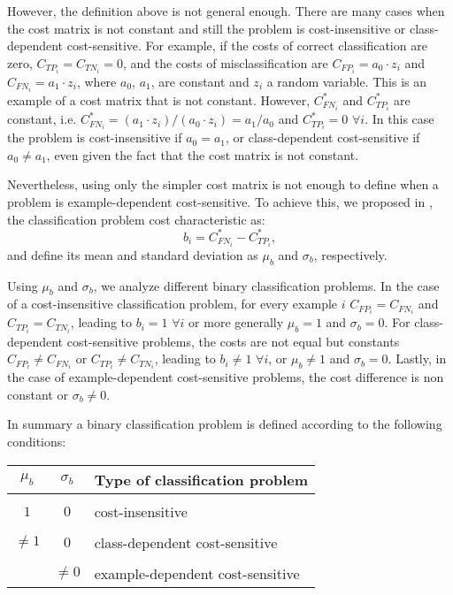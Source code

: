 {{  However, the definition above is not general enough. There are many cases when the cost matrix 
  is not constant and still the problem is cost-insensitive or class-dependent cost-sensitive. 
  For example, if the costs of correct classification are zero, $C_{TP_i}=C_{TN_i}=0$, 
  and the costs of misclassification are $C_{FP_i}=a_0\cdot z_i$ and $C_{FN_i}=a_1\cdot z_i$,
  where $a_0$, $a_1$, are constant and $z_i$ a random variable. This is an example of a cost 
  matrix that is not constant. However, $C^*_{FN_i}$ and $C^*_{TP_i}$ are constant, i.e. 
  $C^*_{FN_i}=(a_1\cdot z_i)/(a_0\cdot z_i)=a_1/a_0$ and $C^*_{TP_i}=0$ $\forall i$. In 
  this case the problem is cost-insensitive if $a_0=a_1$, or class-dependent cost-sensitive if 
  $a_0 \ne a_1$, even given the fact that the cost matrix is not constant.

  Nevertheless, using only the simpler cost matrix is not enough to define when a problem is 
  example-dependent cost-sensitive. To achieve this, we proposed in \citep{CorreaBahnsen2015}, 
  the classification problem cost characteristic as:
  \begin{equation}
    b_i = C^*_{FN_i}-C^*_{TP_i},
  \end{equation}
  and define its mean and standard deviation as $\mu_b$ and $\sigma_b$, respectively.

  Using $\mu_b$ and $\sigma_b$, we analyze different binary classification problems. In the case 
  of a cost-insensitive classification problem, for every example $i$ \mbox{$C_{FP_i}=C_{FN_i}$}
  and $C_{TP_i}=C_{TN_i}$, leading to $b_i=1$ $\forall i$ or more generally $\mu_b=1$ and 
  $\sigma_b=0$. For class-dependent cost-sensitive problems, the costs are not equal but 
  constants \mbox{$C_{FP_i}\ne C_{FN_i}$} or \mbox{$C_{TP_i}\ne C_{TN_i}$}, leading to $b_i \ne 
  1$ $\forall i$, or $\mu_b \ne 1$ and $\sigma_b=0$. Lastly, in the case of example-dependent 
  cost-sensitive problems, the cost difference is non constant or $\sigma_b \ne 0$.

  In summary a binary classification problem is defined according to the following conditions:
  \begin{center}
    \footnotesize
    \begin{tabular}{c | c | l}
      $\mu_b$ & $\sigma_b$ & Type of classification problem \\
      \hline 
      && \\
      $1$ &  $0$ & cost-insensitive \\ &&\\
      $\ne 1$ & $0$ & class-dependent cost-sensitive \\ &&\\
      & $\ne 0$ & example-dependent cost-sensitive \\ 
    \end{tabular}
  \end{center}
  

}}
